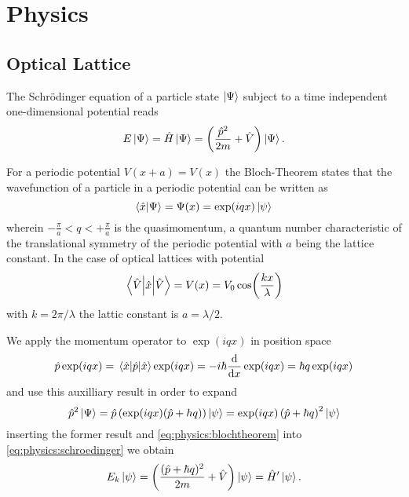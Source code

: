 \chapter{Physics}

\section{Optical Lattice}

The Schrödinger equation of a particle state $\ket{\Psi}$ subject to a time
independent one-dimensional potential reads
\begin{align}
  E\ket{\Psi}
  =\hat{H}\ket{\Psi}
  =\left(\frac{\hat{p}^2}{2m}+\hat{V}\right)\ket{\Psi}
  \label{eq:physics:schroedinger}.
\end{align}

For a periodic potential $V(x+a)=V(x)$ the Bloch-Theorem \cite{Ashcroft1976}
states that the wavefunction of a particle in a periodic potential can be
written as
\begin{equation}
  \braket{\hat{x}}{\Psi}
  =\Psi(x)
  =\exp(iqx)\ket{\psi}
  \label{eq:physics:blochtheorem}
\end{equation}
wherein $-\frac{\pi}{a}<q<+\frac{\pi}{a}$ is the quasimomentum, a quantum
number characteristic of the translational symmetry of the periodic potential
\cite[p. 42]{Lewenstein2012} with $a$ being the lattice constant. In the case
of optical lattices with potential
\begin{equation}
  \expval{\hat{x}}{\hat{V}}
  =V(x)
  =V_0\cos(\frac{k x}{\lambda})
  \label{eq:physics:pospotential}
\end{equation}
with $k=2\pi/\lambda$ the lattic constant is $a=\lambda/2$.

We apply the momentum operator to $\exp(iqx)$ in position space
\begin{equation*}
  \hat{p}\exp(iqx)
  =\expval{\hat{p}}{\hat{x}}\exp(iqx)
  =-i\hbar\dv{x}\exp(iqx)
  =\hbar q\exp(iqx)
\end{equation*}
and use this auxilliary result in order to expand
\begin{equation*}
  \hat{p}^2\ket{\Psi}
  =
  \hat{p}\left(\exp(iqx)(\hat{p}+hq)\right)\ket{\psi}
  =
  \exp(iqx)\left(\hat{p}+\hbar q\right)^2\ket{\psi}
\end{equation*}
inserting the former result and \cref{eq:physics:blochtheorem} into
\cref{eq:physics:schroedinger} we obtain
\begin{equation}
  E_k\ket{\psi}
  =\left(\frac{(\hat{p}+\hbar q)^2}{2m}+\hat{V}\right)\ket{\psi}
  =\hat{H}^\prime\ket{\psi}
  \label{eq:physics1}.
\end{equation}

